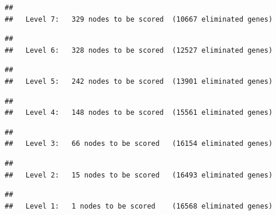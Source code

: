 \documentclass[
]{article}
\begin{document}
\begin{verbatim}
## 
##   Level 7:   329 nodes to be scored  (10667 eliminated genes)
\end{verbatim}

\begin{verbatim}
## 
##   Level 6:   328 nodes to be scored  (12527 eliminated genes)
\end{verbatim}

\begin{verbatim}
## 
##   Level 5:   242 nodes to be scored  (13901 eliminated genes)
\end{verbatim}

\begin{verbatim}
## 
##   Level 4:   148 nodes to be scored  (15561 eliminated genes)
\end{verbatim}

\begin{verbatim}
## 
##   Level 3:   66 nodes to be scored   (16154 eliminated genes)
\end{verbatim}

\begin{verbatim}
## 
##   Level 2:   15 nodes to be scored   (16493 eliminated genes)
\end{verbatim}

\begin{verbatim}
## 
##   Level 1:   1 nodes to be scored    (16568 eliminated genes)
\end{verbatim}
\end{document}
